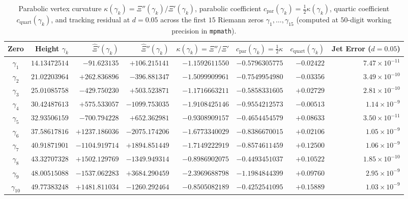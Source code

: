 \documentclass[11pt,a4paper,reqno]{amsart}
\theoremstyle{definition}
\theoremstyle{remark}
\numberwithin{equation}{section}
\begin{document}
\begin{table}[htbp]
\centering
\caption{Parabolic vertex curvature $\kappa(\gamma_k) = \Xi''(\gamma_k)/\Xi'(\gamma_k)$, parabolic coefficient $c_{\mathrm{par}}(\gamma_k) = \frac{1}{2}\kappa(\gamma_k)$, quartic coefficient $c_{\mathrm{quart}}(\gamma_k)$, and tracking residual at $d = 0.05$ across the first $15$ Riemann zeros $\gamma_1, \dots, \gamma_{15}$ (computed at $50$-digit working precision in \texttt{mpmath}).}\label{tab:curvature_15}
\scriptsize
\setlength{\tabcolsep}{3.2pt}
\begin{tabular}{crrrrrrr}
\toprule
\textbf{Zero} & \textbf{Height $\gamma_k$} & \textbf{$\widehat{\Xi}'(\gamma_k)$} & \textbf{$\widehat{\Xi}''(\gamma_k)$} & \textbf{$\kappa(\gamma_k) = \Xi''/\Xi'$} & \textbf{$c_{\mathrm{par}}(\gamma_k) = \tfrac{1}{2}\kappa$} & \textbf{$c_{\mathrm{quart}}(\gamma_k)$} & \textbf{Jet Error ($d=0.05$)} \\
\midrule
$\gamma_1$    & $14.13472514$ & $-91.623135$   & $+106.215141$  & $-1.1592611550$ & $-0.5796305775$ & $-0.02422$ & $7.47 \times 10^{-11}$ \\
$\gamma_2$    & $21.02203964$ & $+262.836896$  & $-396.881347$  & $-1.5099909961$ & $-0.7549954980$ & $-0.03356$ & $3.49 \times 10^{-10}$ \\
$\gamma_3$    & $25.01085758$ & $-429.750230$  & $+503.523871$  & $-1.1716663211$ & $-0.5858331605$ & $+0.02729$ & $2.81 \times 10^{-10}$ \\
$\gamma_4$    & $30.42487613$ & $+575.533057$  & $-1099.753035$ & $-1.9108425146$ & $-0.9554212573$ & $-0.00513$ & $1.14 \times 10^{-9}$  \\
$\gamma_5$    & $32.93506159$ & $-700.794228$  & $+652.362981$  & $-0.9308909157$ & $-0.4654454579$ & $+0.08633$ & $3.50 \times 10^{-11}$ \\
$\gamma_6$    & $37.58617816$ & $+1237.186036$ & $-2075.174206$ & $-1.6773340029$ & $-0.8386670015$ & $+0.02106$ & $1.05 \times 10^{-9}$  \\
$\gamma_7$    & $40.91871901$ & $-1104.919714$ & $+1894.851449$ & $-1.7149222919$ & $-0.8574611459$ & $+0.12500$ & $1.06 \times 10^{-9}$  \\
$\gamma_8$    & $43.32707328$ & $+1502.129769$ & $-1349.949314$ & $-0.8986902075$ & $-0.4493451037$ & $+0.10522$ & $1.85 \times 10^{-10}$ \\
$\gamma_9$    & $48.00515088$ & $-1537.062283$ & $+3684.290459$ & $-2.3969688798$ & $-1.1984844399$ & $+0.09760$ & $2.95 \times 10^{-9}$  \\
$\gamma_{10}$ & $49.77383248$ & $+1481.811034$ & $-1260.292464$ & $-0.8505082189$ & $-0.4252541095$ & $+0.15889$ & $1.03 \times 10^{-9}$  \\

\end{tabular}
\end{table}
\end{document}
